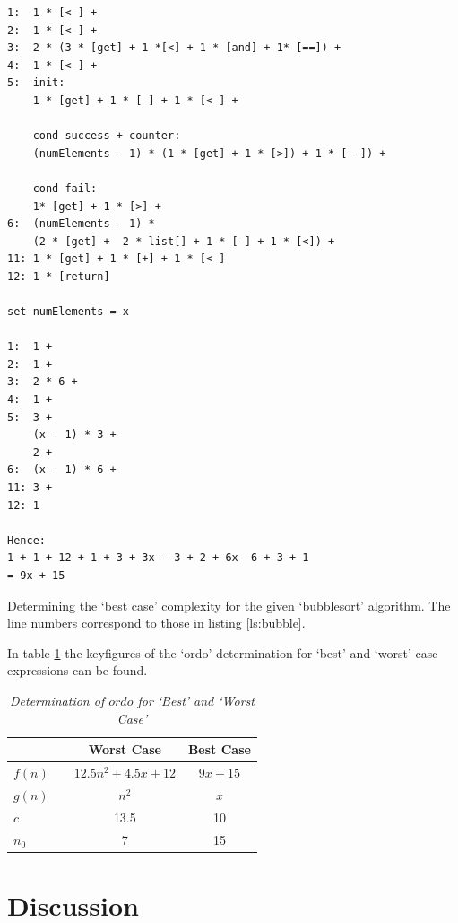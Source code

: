 \documentclass[a4paper,11pt,twoside]{article}
\begin{document}
\begin{listing}
\begin{verbatim}
1:  1 * [<-] +
2:  1 * [<-] +
3:  2 * (3 * [get] + 1 *[<] + 1 * [and] + 1* [==]) +
4:  1 * [<-] +
5:  init:
    1 * [get] + 1 * [-] + 1 * [<-] +

    cond success + counter:
    (numElements - 1) * (1 * [get] + 1 * [>]) + 1 * [--]) +
    
    cond fail:
    1* [get] + 1 * [>] + 
6:  (numElements - 1) * 
    (2 * [get] +  2 * list[] + 1 * [-] + 1 * [<]) +
11: 1 * [get] + 1 * [+] + 1 * [<-]
12: 1 * [return]

set numElements = x

1:  1 +
2:  1 +
3:  2 * 6 +
4:  1 +
5:  3 + 
    (x - 1) * 3 +
    2 +
6:  (x - 1) * 6 +
11: 3 +
12: 1 

Hence:
1 + 1 + 12 + 1 + 3 + 3x - 3 + 2 + 6x -6 + 3 + 1
= 9x + 15

\end{verbatim}
\caption{Determining the `best case' complexity for the given
  `bubblesort' algorithm. The line numbers correspond to those in
  listing \ref{ls:bubble}.\label{ls:best}}
\end{listing}

In table \ref{tab:ordo2} the keyfigures of the `ordo' determination for
`best' and `worst' case expressions can be found. 

\begin{table}[]
\caption{\textit{Determination of $ordo$ for `Best' and `Worst Case'}}
\label{tab:ordo2}
\begin{tabular}{llcc}
&  & Worst Case & Best Case \\ 
\hline
$f(n)$ &  & \multicolumn{1}{c}{$12.5n^2+4.5x+12$} & \multicolumn{1}{c}{$9x+15$} \\
$g(n)$ &  & \multicolumn{1}{c}{$n^2$}             & \multicolumn{1}{c}{$x$}   \\
$c$    &  & 13.5                                  & 10                          \\
$n_0$  &  & 7                                     & 15                          \\                         
\end{tabular}
\end{table}

\section{Discussion}
\end{document}
